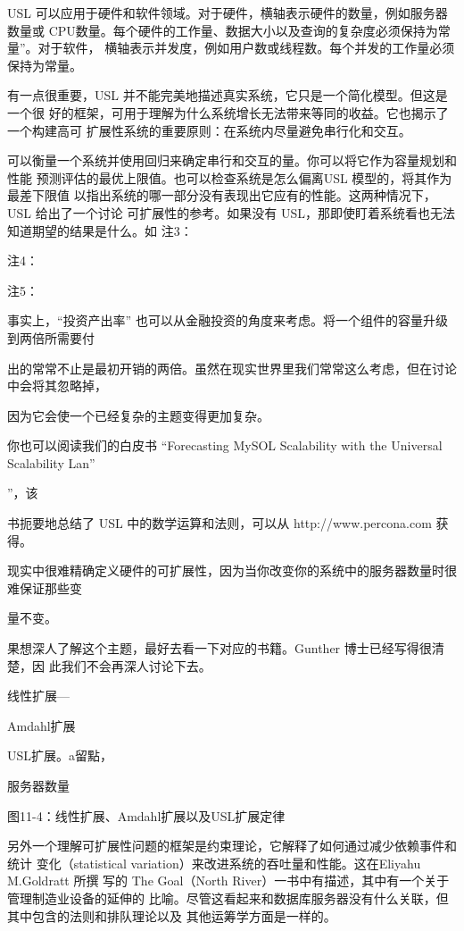 USL 可以应用于硬件和软件领域。对于硬件，横轴表示硬件的数量，例如服务器数量或
CPU数量。每个硬件的工作量、数据大小以及查询的复杂度必须保持为常量”。对于软件，
横轴表示并发度，例如用户数或线程数。每个并发的工作量必须保持为常量。

有一点很重要，USL 并不能完美地描述真实系统，它只是一个简化模型。但这是一个很
好的框架，可用于理解为什么系统增长无法带来等同的收益。它也揭示了一个构建高可
扩展性系统的重要原则：在系统内尽量避免串行化和交互。

可以衡量一个系统并使用回归来确定串行和交互的量。你可以将它作为容量规划和性能
预测评估的最优上限值。也可以检查系统是怎么偏离USL 模型的，将其作为最差下限值
以指出系统的哪一部分没有表现出它应有的性能。这两种情况下，USL 给出了一个讨论
可扩展性的参考。如果没有 USL，那即使盯着系统看也无法知道期望的结果是什么。如
注3：

注4：

注5：

事实上，“投资产出率” 也可以从金融投资的角度来考虑。将一个组件的容量升级到两倍所需要付

出的常常不止是最初开销的两倍。虽然在现实世界里我们常常这么考虑，但在讨论中会将其忽略掉，

因为它会使一个已经复杂的主题变得更加复杂。

你也可以阅读我们的白皮书 “Forecasting MySOL Scalability with the Universal Scalability Lan”

”，该

书扼要地总结了 USL 中的数学运算和法则，可以从 http://www.percona.com 获得。

现实中很难精确定义硬件的可扩展性，因为当你改变你的系统中的服务器数量时很难保证那些变

量不变。

果想深人了解这个主题，最好去看一下对应的书籍。Gunther 博士已经写得很清楚，因
此我们不会再深人讨论下去。

线性扩展—

Amdahl扩展

USL扩展。a留點，

服务器数量

图11-4：线性扩展、Amdahl扩展以及USL扩展定律

另外一个理解可扩展性问题的框架是约束理论，它解释了如何通过减少依赖事件和统计
变化（statistical variation）来改进系统的吞吐量和性能。这在Eliyahu M.Goldratt 所撰
写的 The Goal（North River）一书中有描述，其中有一个关于管理制造业设备的延伸的
比喻。尽管这看起来和数据库服务器没有什么关联，但其中包含的法则和排队理论以及
其他运筹学方面是一样的。

